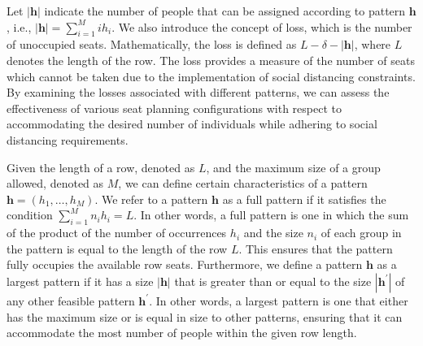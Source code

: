 Let $|\bm{h}|$ indicate the number of people that can be assigned according to pattern $\bm{h}$, i.e., $|\bm{h}| = \sum_{i =1}^{M} i h_i$. We also introduce the concept of loss, which is the number of unoccupied seats. Mathematically, the loss is defined as $L- \delta - |\bm{h}|$, where $L$ denotes the length of the row. The loss provides a measure of the number of seats which cannot be taken due to the implementation of social distancing constraints. By examining the losses associated with different patterns, we can assess the effectiveness of various seat planning configurations with respect to accommodating the desired number of individuals while adhering to social distancing requirements.


\begin{definition}
Given the length of a row, denoted as $L$, and the maximum size of a group allowed, denoted as $M$, we can define certain characteristics of a pattern $\bm{h} = (h_1, \ldots, h_M)$.
We refer to a pattern $\bm{h}$ as a full pattern if it satisfies the condition $\sum_{i=1}^{M} n_i h_i = L$. In other words, a full pattern is one in which the sum of the product of the number of occurrences $h_i$ and the size $n_i$ of each group in the pattern is equal to the length of the row $L$. This ensures that the pattern fully occupies the available row seats.
Furthermore, we define a pattern $\bm{h}$ as a largest pattern if it has a size $|\bm{h}|$ that is greater than or equal to the size $|\bm{h}^{\prime}|$ of any other feasible pattern $\bm{h}^{\prime}$. In other words, a largest pattern is one that either has the maximum size or is equal in size to other patterns, ensuring that it can accommodate the most number of people within the given row length.
\end{definition}




